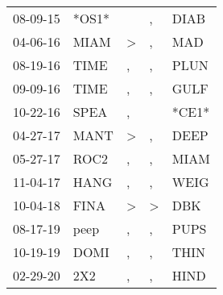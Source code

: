 \begin{supertabular}{lllll}
 08-09-15 &  *OS1* &               &                , &   DIAB \\
 04-06-16 &   MIAM &  \textgreater &                , &    MAD \\
 08-19-16 &   TIME &             , &                , &   PLUN \\
 09-09-16 &   TIME &             , &                , &   GULF \\
 10-22-16 &   SPEA &             , &                  &  *CE1* \\
 04-27-17 &   MANT &  \textgreater &                , &   DEEP \\
 05-27-17 &   ROC2 &             , &                , &   MIAM \\
 11-04-17 &   HANG &             , &                , &   WEIG \\
 10-04-18 &   FINA &  \textgreater &     \textgreater &    DBK \\
 08-17-19 &   peep &             , &                , &   PUPS \\
 10-19-19 &   DOMI &             , &                , &   THIN \\
 02-29-20 &    2X2 &             , &                , &   HIND \\
\end{supertabular}

